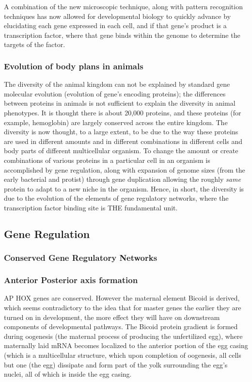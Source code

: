A combination of the new microscopic technique, along with pattern recognition techniques has now allowed for developmental biology to quickly advance by elucidating each gene expressed in each cell, and if that gene's product is a transcription factor, where that gene binds within the genome to determine the targets of the factor.

 

\subsubsection{Evolution of body plans in animals}

The diversity of the animal kingdom can not be explained by standard gene molecular evolution (evolution of gene's encoding proteins); the differences between proteins in animals is not sufficient to explain the diversity in animal phenotypes\cite{pmid1090005}.  It is thought there is about 20,000 proteins, and these proteins (for example, hemoglobin) are largely conserved across the entire kingdom.  The diversity is now thought, to a large extent, to be due to the way these proteins are used in different amounts and in different combinations in different cells and body parts of different multicellular organism.  To change the amount or create combinations of various proteins in a particular cell in an organism is accomplished by gene regulation, along with expansion of genome sizes (from the early bacterial and protist) through gene duplication allowing the roughly \textit{same} protein to adapt to a new niche in the organism.  Hence, in short, the diversity is due to the evolution of the elements of gene regulatory networks, where the transcription factor binding site is THE fundamental unit.

 

\subsection{Gene Regulation}

  
\subsubsection{Conserved Gene Regulatory Networks}
\subsubsection*{Anterior Posterior axis formation}
AP HOX genes are conserved.  However the maternal element Bicoid is derived, which seems contradictory to the idea that for master genes the earlier they are turned on in development, the more effect they will have on downstream components of developmental pathways.  The Bicoid protein gradient is formed during oogenesis (the maternal process of producing the unfertilized egg), where maternally laid mRNA becomes localized to the anterior portion of the egg casing (which is a multicellular structure, which upon completion of oogenesis, all cells but one (the egg) dissipate and form part of the yolk surrounding the egg's nuclei, all of which is inside the egg casing.

